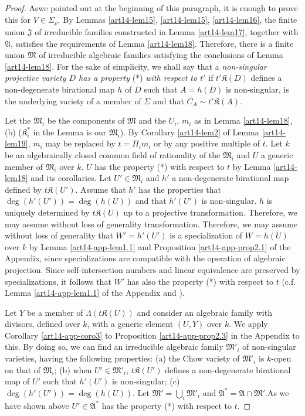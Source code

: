\begin{proof}
As\pageoriginale we pointed out at the beginning of this paragraph, it is enough to prove this for $V\in \Sigma_{\rho}$. By Lemmas \ref{art14-lem15}, \ref{art14-lem15}, \ref{art14-lem16}, the finite union $\mathfrak{J}$ of irreducible families constructed in Lemma \ref{art14-lem17}, together with $\mathfrak{A}$, satisfies the requirements of Lemma \ref{art14-lem18}. Therefore, there is a finite union $\mathfrak{M}$ of irreducible algebraic families satisfying the conclusions of Lemma \ref{art14-lem18}. For the sake of simplicity, we shall say that a {\em non-singular projective variety $D$ has a property} (*) {\em with respect to $t'$} if $t'\mathfrak{K}(D)$ defines a non-degenerate birational map $h$ of $D$ such that $A=h(D)$ is non-singular, is the underlying variety of a member of $\Sigma$ and that $C_{A}\sim t'\mathfrak{K}(A)$.

Let the $\mathfrak{M}_{i}$ be the components of $\mathfrak{M}$ and the $U_{i}$, $m_{i}$ as in Lemma \ref{art14-lem18}, (b) ($\mathfrak{K}^{*}_{i}$ in the Lemma is our $\mathfrak{M}_{i}$). By Corollary \ref{art14-lem2} of Lemma \ref{art14-lem19}, $m_{i}$ may be replaced by $t=\Pi_{i}m_{i}$ or by any positive multiple of $t$. Let $k$ be an algebraically closed common field of rationality of the $\mathfrak{M}_{i}$ and $U$ a generic member of $\mathfrak{M}_{i}$ over $k$. $U$ has the property (*) with respect to $t$ by Lemma \ref{art14-lem18} and its corollaries. Let $U'\in \mathfrak{M}_{i}$ and $h'$ a non-degenerate birational map defined by $t\mathfrak{K}(U')$. Assume that $h'$ has the properties that $\deg(h'(U'))=\deg (h(U))$ and that $h'(U')$ is non-singular. $h$ is uniquely determined by $t\mathfrak{K}(U)$ up to a projective transformation. Therefore, we may assume without loss of generality transformation. Therefore, we may assume without loss of generality that $W'=h'(U')$ is a specialization of $W=h(U)$ over $k$ by Lemma \ref{art14-app-lem1.1} and Proposition \ref{art14-app-prop2.1} of the Appendix, since specializations are compatible with the operation of algebraic projection. Since self-intersection numbers and linear equivalence are preserved by specializations, it follows that $W'$ has also the property (*) with respect to $t$ (c.f. Lemma \ref{art14-app-lem1.1} of the Appendix and \cite{art14-key2}).

Let $Y$ be a member of $\Lambda(t\mathfrak{K}(U))$ and consider an algebraic family with divisors, defined over $k$, with a generic element $(U,Y)$ over $k$. We apply Corollary \ref{art14-app-coro3} to Proposition \ref{art14-app-prop2.3} in the Appendix to this. By doing so, we can find an irreducible algebraic family $\mathfrak{M}'_{i}$ of non-singular varieties, having the following properties: (a) the Chow variety of $\mathfrak{M}'_{i}$ is $k$-open on that of $\mathfrak{M}_{i}$; (b) when $U'\in \mathfrak{M}'_{i}$, $t\mathfrak{K}(U')$ defines a non-degenerate birational map of $U'$ such that $h'(U')$ is non-singular; (c) $\deg(h'(U'))=\deg (h(U))$. Let $\mathfrak{M}'=\bigcup_{i}\mathfrak{M}'_{i}$ and $\mathfrak{A}^{*}=\mathfrak{A}\cap \mathfrak{M}'$.\pageoriginale As we have shown above $U'\in \mathfrak{A}^{*}$ has the property (*) with respect to $t$.


\end{proof}
